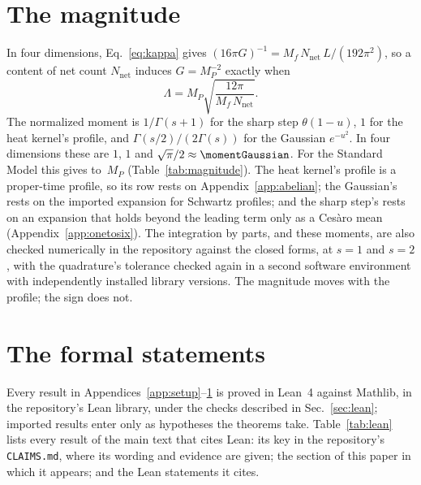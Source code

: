 \documentclass[aps,prd,reprint,amsmath,amssymb,superscriptaddress,nofootinbib]{revtex4-2}
\newcommand{\Nnet}{N_{\mathrm{net}}}
\begin{document}
\section{The magnitude}
\label{app:magnitude}

\begin{table}
\caption{The results that cite Lean: each result's key in the repository's
\texttt{CLAIMS.md}, the section in which it appears, and the Lean statements it cites.}
\label{tab:lean}
\centering
\small

\end{table}

In four dimensions, Eq.~\eqref{eq:kappa} gives $(16\pi G)^{-1}=M_f\,\Nnet\,L/(192\pi^2)$, so
a content of net count $\Nnet$ induces $G=M_P^{-2}$ exactly when
\begin{equation}
  \Lambda=M_P\sqrt{\frac{12\pi}{M_f\,\Nnet}} .
\end{equation}
The normalized moment is $1/\Gamma(s+1)$ for the sharp step $\theta(1-u)$, $1$ for the
heat kernel's profile, and $\Gamma(s/2)/(2\Gamma(s))$ for the Gaussian $e^{-u^2}$. In four
dimensions these are $1$, $1$ and $\sqrt\pi/2\approx\momentGaussian$. For the Standard
Model this gives \smCutoffLow{} to \smCutoffHigh\,$M_P$ (Table~\ref{tab:magnitude}). The
heat kernel's profile is a proper-time profile, so its row rests on
Appendix~\ref{app:abelian}; the Gaussian's rests on the imported expansion for Schwartz
profiles; and the sharp step's rests on an expansion that holds beyond the leading term
only as a Ces\`aro mean (Appendix~\ref{app:onetosix}). The integration by parts, and these
moments, are also checked numerically in the repository against the closed forms, at
$s=1$ and $s=2$, with the quadrature's tolerance checked again in a second software environment with
independently installed library versions. The magnitude moves with the profile; the sign does not.

\section{The formal statements}
\label{app:formal}

Every result in Appendices~\ref{app:setup}--\ref{app:magnitude} is proved in Lean~4
against Mathlib, in the repository's Lean library, under the checks described in
Sec.~\ref{sec:lean}; imported results enter only as hypotheses the theorems take.
Table~\ref{tab:lean} lists every result of the main text that cites Lean: its key in
the repository's \texttt{CLAIMS.md}, where its wording and evidence are given; the
section of this paper in which it appears; and the Lean statements it cites.


\end{document}
